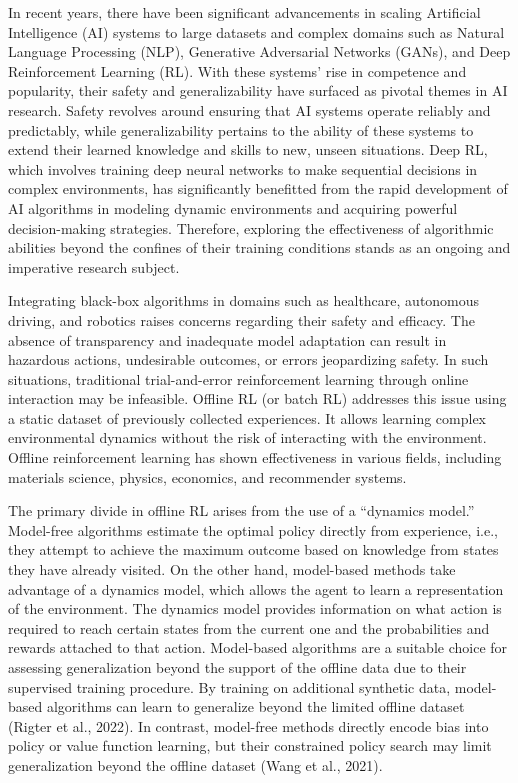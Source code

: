 In recent years, there have been significant advancements in scaling Artificial Intelligence (AI) systems to large datasets and complex domains such as Natural Language Processing (NLP), Generative Adversarial Networks (GANs), and Deep Reinforcement Learning (RL). With these systems’ rise in competence and popularity, their safety and generalizability have surfaced as pivotal themes in AI research. Safety revolves around ensuring that AI systems operate reliably and predictably, while generalizability pertains to the ability of these systems to extend their learned knowledge and skills to new, unseen situations. Deep RL, which involves training deep neural networks to make sequential decisions in complex environments, has significantly benefitted from the rapid development of AI algorithms in modeling dynamic environments and acquiring powerful decision-making strategies. Therefore, exploring the effectiveness of algorithmic abilities beyond the confines of their training conditions stands as an ongoing and imperative research subject. 

Integrating black-box algorithms in domains such as healthcare, autonomous driving, and robotics raises concerns regarding their safety and efficacy. The absence of transparency and inadequate model adaptation can result in hazardous actions, undesirable outcomes, or errors jeopardizing safety. In such situations, traditional trial-and-error reinforcement learning through online interaction may be infeasible. Offline RL (or batch RL) addresses this issue using a static dataset of previously collected experiences. It allows learning complex environmental dynamics without the risk of interacting with the environment. Offline reinforcement learning has shown effectiveness in various fields, including materials science, physics, economics, and recommender systems.


The primary divide in offline RL arises from the use of a “dynamics model.” Model-free algorithms estimate the optimal policy directly from experience, i.e., they attempt to achieve the maximum outcome based on knowledge from states they have already visited. On the other hand, model-based methods take advantage of a dynamics model, which allows the agent to learn a representation of the environment. The dynamics model provides information on what action is required to reach certain states from the current one and the probabilities and rewards attached to that action. Model-based algorithms are a suitable choice for assessing generalization beyond the support of the offline data due to their supervised training procedure. By training on additional synthetic data, model-based algorithms can learn to generalize beyond the limited offline dataset (Rigter et al., 2022). In contrast, model-free methods directly encode bias into policy or value function learning, but their constrained policy search may limit generalization beyond the offline dataset (Wang et al., 2021). 

